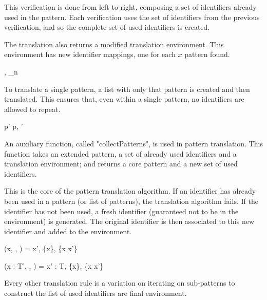 \documentclass[class=article, crop=false]{standalone}
\begin{document}
This verification is done from left to right, composing a set of identifiers already used in the pattern.
Each verification uses the set of identifiers from the previous verification, and so the complete set of used identifiers is created.

The translation also returns a modified translation environment.
This environment has new identifier mappings, one for each $x$ pattern found.

  {\gamma \vdash [p_1', \; \dots \; p_n'] \Rightarrow [p_1, \; \dots \; p_n], \gamma_n}

To translate a single pattern, a list with only that pattern is created and then translated.
This ensures that, even within a single pattern, no identifiers are allowed to repeat.

  {\gamma \vdash p' \Rightarrow p, \gamma'}

An auxiliary function, called "collectPatterns", is used in pattern translation.
This function takes an extended pattern, a set of already used identifiers and a translation environment; and returns a core pattern and a new set of used identifiers.

\bigskip

This is the core of the pattern translation algorithm.
If an identifier has already been used in a pattern (or list of patterns), the translation algorithm fails.
If the identifier has not been used, a fresh identifier (guaranteed not to be in the environment) is generated.
The original identifier is then associated to this new identifier and added to the environment.

  {(x, , \gamma) = x',  \cup \{x\}, \gamma \cup \{x \rightarrow x'\}}

  {(x : T', , \gamma) = x' : T,  \cup \{x\}, \gamma \cup \{x \rightarrow x'\}}

\bigskip

Every other translation rule is a variation on iterating on sub-patterns to construct the list of used identifiers are final environment.
\end{document}
